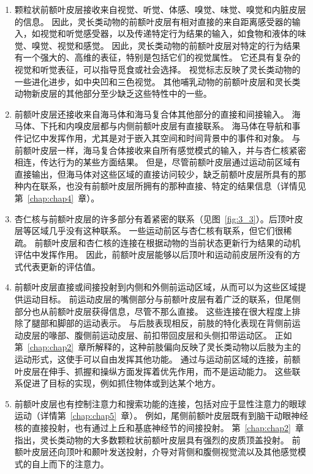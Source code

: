 \begin{enumerate}
\item 颗粒状前额叶皮层接收来自视觉、听觉、体感、嗅觉、味觉、嗅觉和内脏皮层的信息。
因此，灵长类动物的前额叶皮层有相对直接的来自距离感受器的输入，如视觉和听觉感受器，以及传递特定行为结果的输入，如食物和液体的味觉、嗅觉、视觉和感觉。
因此，灵长类动物的前额叶皮层对特定的行为结果有一个强大的、高维的表征，特别是包括它们的视觉属性。
它还具有复杂的视觉和听觉表征，可以指导觅食或社会选择。
视觉标志反映了灵长类动物的一些进化进步，如中央凹和三色视觉。
其他哺乳动物的前额叶皮层和灵长类动物新皮层的其他部分至少缺乏这些特性中的一些。

\item 前额叶皮层还接收来自海马体和海马复合体其他部分的直接和间接输入。
海马体、下托和内嗅皮层都与内侧前额叶皮层有直接联系。
海马体在导航和事件记忆中发挥作用，尤其是对于嵌入其空间和时间背景中的事件和对象。
与前额叶皮层一样，海马复合体接收来自所有感觉模式的输入，并与杏仁核紧密相连，传达行为的某些方面结果。
但是，尽管前额叶皮层通过运动前区域有直接输出，但海马体对这些区域的直接访问较少，缺乏前额叶皮层所具有的那种内在联系，也没有前额叶皮层所拥有的那种直接、特定的结果信息（详情见第~\ref{chap:chap4}~章）。


\item 杏仁核与前额叶皮层的许多部分有着紧密的联系（见图~\ref{fig:3_3}）。后顶叶皮层等区域几乎没有这种联系。
一些运动前区与杏仁核有联系，但它们很稀疏\cite{avendan1983evidence}。
前额叶皮层和杏仁核的连接在根据动物的当前状态更新行为结果的动机评估中发挥作用。
因此，前额叶皮层能够以后顶叶和运动前皮层所没有的方式代表更新的评估值。

\item 前额叶皮层直接或间接投射到内侧和外侧前运动区域，从而可以为这些区域提供运动目标。
前运动皮层的嘴侧部分与前额叶皮层有着广泛的联系，但尾侧部分也从前额叶皮层获得信息，尽管不那么直接。
这些连接在很大程度上排除了腿部和脚部的运动表示。
与后肢表现相反，前肢的特化表现在背侧前运动皮层的喙部\cite{tachibana2004input}、腹侧前运动皮层\cite{he1993topographic}、前扣带回皮层\cite{luppino1991multiple}和头侧扣带运动区\cite{he1995topographic}。
正如第~\ref{chap:chap2}~章所解释的，这种前肢偏向反映了灵长类动物以后肢为主的运动形式，这使手可以自由发挥其他功能。
通过与运动前区域的连接，前额叶皮层在伸手、抓握和操纵方面发挥着优先作用，而不是运动能力。
这些联系促进了目标的实现，例如抓住物体或到达某个地方。


\item 前额叶皮层也有控制注意力和搜索功能的连接，包括对应于显性注意力的眼球运动（详情第~\ref{chap:chap5}~章）。
例如，尾侧前额叶皮层既有到脑干动眼神经核的直接投射，也有通过上丘和基底神经节的间接投射。
第~\ref{chap:chap2}~章指出，灵长类动物的大多数颗粒状前额叶皮层具有强烈的皮质顶盖投射\cite{leichnetz1981prefrontal}。
前额叶皮层还向顶叶和颞叶发送投射，介导对背侧和腹侧视觉流以及其他感觉模式的自上而下的注意力。



\end{enumerate}
